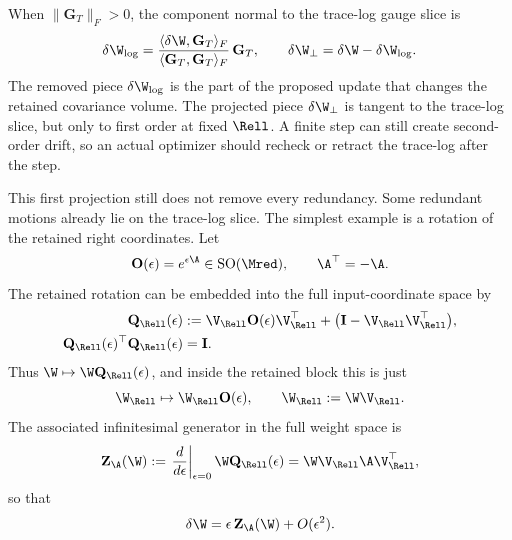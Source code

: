 When \(\|\mathbf G_T\|_F>0\), the component normal to the trace-log gauge slice is
\begin{equation}
  \delta\W_{\log}
  =
  \frac{\langle\delta\W,\mathbf G_T\rangle_F}
       {\langle\mathbf G_T,\mathbf G_T\rangle_F}\,\mathbf G_T,
  \qquad
  \delta\W_{\perp}
  =
  \delta\W-\delta\W_{\log}.
  \label{eq:trace_log_projection}
\end{equation}
The removed piece \(\delta\W_{\log}\) is the part of the proposed update that changes the retained covariance volume.  The projected piece \(\delta\W_{\perp}\) is tangent to the trace-log slice, but only to first order at fixed \(\Rell\).  A finite step can still create second-order drift, so an actual optimizer should recheck or retract the trace-log after the step.

This first projection still does not remove every redundancy.  Some redundant motions already lie on the trace-log slice.  The simplest example is a rotation of the retained right coordinates.  Let
\begin{equation}
  \mathbf O(\epsilon)=e^{\epsilon\A}\in \mathrm{SO}(\Mred),
  \qquad
  \A^\top=-\A .
  \label{eq:retained_rotation_group}
\end{equation}
The retained rotation can be embedded into the full input-coordinate space by
\begin{equation}
\begin{aligned}
  \mathbf Q_{\Rell}(\epsilon)
  &:=
  \V_{\Rell}\mathbf O(\epsilon)\V_{\Rell}^{\top}
  +
  \big(\mathbf I-\V_{\Rell}\V_{\Rell}^{\top}\big),\\
  \mathbf Q_{\Rell}(\epsilon)^{\top}
  \mathbf Q_{\Rell}(\epsilon)&=\mathbf I .
\end{aligned}
  \label{eq:retained_rotation_embedding}
\end{equation}
Thus \(\W\mapsto\W\mathbf Q_{\Rell}(\epsilon)\), and inside the retained block this is just
\begin{equation}
  \W_{\Rell}
  \mapsto
  \W_{\Rell}\mathbf O(\epsilon),
  \qquad
  \W_{\Rell}:=\W\V_{\Rell}.
  \label{eq:retained_weight_rotation}
\end{equation}
The associated infinitesimal generator in the full weight space is
\begin{equation}
  \mathbf Z_{\A}(\W)
  :=
  \left.\frac{d}{d\epsilon}\right|_{\epsilon=0}
  \W\mathbf Q_{\Rell}(\epsilon)
  =
  \W\V_{\Rell}\A\V_{\Rell}^{\top},
  \label{eq:ZA_definition}
\end{equation}
so that
\begin{equation}
  \delta\W
  =
  \epsilon\,\mathbf Z_{\A}(\W)+O(\epsilon^2).
  \label{eq:deltaW_ZA}
\end{equation}
